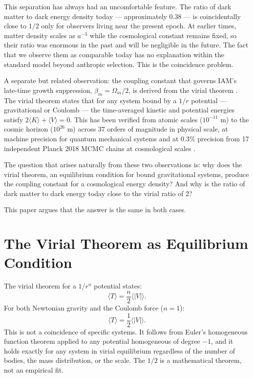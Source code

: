 \documentclass[12pt,a4paper]{article}
\begin{document}
This separation has always had an uncomfortable feature. The ratio of dark
matter to dark energy density today --- approximately $0.38$ --- is
coincidentally close to $1/2$ only for observers living near the present epoch.
At earlier times, matter density scales as $a^{-3}$ while the cosmological
constant remains fixed, so their ratio was enormous in the past and will be
negligible in the future. The fact that we observe them as comparable today
has no explanation within the standard model beyond anthropic selection. This
is the coincidence problem.

A separate but related observation: the coupling constant that governs IAM's
late-time growth suppression, $\beta_m = \Omega_m/2$, is derived from the
virial theorem \citep{mahaffey2026}. The virial theorem states that for any
system bound by a $1/r$ potential --- gravitational or Coulomb --- the
time-averaged kinetic and potential energies satisfy $2\langle K \rangle +
\langle V \rangle = 0$. This has been verified from atomic scales ($10^{-11}$
m) to the cosmic horizon ($10^{26}$ m) across 37 orders of magnitude in
physical scale, at machine precision for quantum mechanical systems and at
$0.3\%$ precision from 17 independent Planck 2018 MCMC chains at cosmological
scales \citep{mahaffey2026_virial}.

The question that arises naturally from these two observations is: why does
the virial theorem, an equilibrium condition for bound gravitational systems,
produce the coupling constant for a cosmological energy density? And why is
the ratio of dark matter to dark energy today close to the virial ratio of 2?

This paper argues that the answer is the same in both cases.

\section{The Virial Theorem as Equilibrium Condition}
\label{sec:virial}

The virial theorem for a $1/r^n$ potential states:
\begin{equation}
  \langle T \rangle = \frac{n}{2} \langle |V| \rangle.
  \label{eq:virial_general}
\end{equation}
For both Newtonian gravity and the Coulomb force ($n = 1$):
\begin{equation}
  \langle T \rangle = \frac{1}{2} \langle |V| \rangle.
  \label{eq:virial_half}
\end{equation}
This is not a coincidence of specific systems. It follows from Euler's
homogeneous function theorem applied to any potential homogeneous of degree
$-1$, and it holds exactly for any system in virial equilibrium regardless of
the number of bodies, the mass distribution, or the scale. The $1/2$ is a
mathematical theorem, not an empirical fit.
\end{document}
